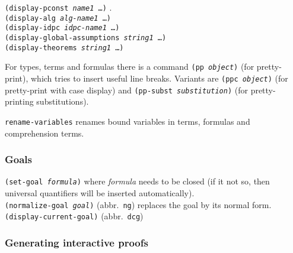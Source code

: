 \documentclass[12pt]{amsart}
\begin{document}
\texttt{(display-pconst \textsl{name1} \dots)}%
.\\

\texttt{(display-alg \textsl{alg-name1} \dots)}%
\\

\texttt{(display-idpc \textsl{idpc-name1} \dots)}%
\\

\texttt{(display-global-assumptions \textsl{string1} \dots)}%
\\

\texttt{(display-theorems \textsl{string1} \dots)}%

For types, terms and formulas there is a command \texttt{(pp
  \textsl{object})} (for pretty-print), which
tries to insert useful line breaks.  Variants are \texttt{(ppc
  \textsl{object})} (for pretty-print with case
display) and \texttt{(pp-subst \textsl{substitution})}%
 (for pretty-printing substitutions).

\texttt{rename-variables}%
 renames bound
variables in terms, formulas and comprehension terms.

\subsubsection{Goals}

\texttt{(set-goal \textsl{formula})}
where \textsl{formula} needs to be closed (if it not so, then
universal quantifiers will be inserted automatically).\\

\texttt{(normalize-goal \textsl{goal})}%
  (abbr.\
\texttt{ng})
replaces the goal by its normal form.\\

\texttt{(display-current-goal)}%
 (abbr.\ \texttt{dcg})


\subsubsection{Generating interactive proofs}
\end{document}
